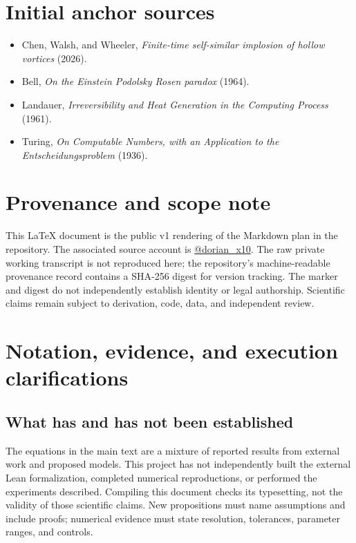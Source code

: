 \documentclass[11pt]{article}
\theoremstyle{definition}
\theoremstyle{plain}
\theoremstyle{remark}
\begin{document}
\section{Initial anchor sources}

\begin{itemize}
  \item Chen, Walsh, and Wheeler, \emph{Finite-time self-similar implosion of hollow vortices} (2026).
  \item Bell, \emph{On the Einstein Podolsky Rosen paradox} (1964).
  \item Landauer, \emph{Irreversibility and Heat Generation in the Computing Process} (1961).
  \item Turing, \emph{On Computable Numbers, with an Application to the Entscheidungsproblem} (1936).
\end{itemize}

\section*{Provenance and scope note}

This LaTeX document is the public v1 rendering of the Markdown plan in the repository. The associated source account is \href{https://x.com/dorian_x10}{@dorian\_x10}. The raw private working transcript is not reproduced here; the repository's machine-readable provenance record contains a SHA-256 digest for version tracking. The marker and digest do not independently establish identity or legal authorship. Scientific claims remain subject to derivation, code, data, and independent review.

\clearpage
\appendix
\section{Notation, evidence, and execution clarifications}\label{app:clarifications}

\subsection{What has and has not been established}

The equations in the main text are a mixture of reported results from external work and proposed models. This project has not independently built the external Lean formalization, completed numerical reproductions, or performed the experiments described. Compiling this document checks its typesetting, not the validity of those scientific claims. New propositions must name assumptions and include proofs; numerical evidence must state resolution, tolerances, parameter ranges, and controls.
\end{document}
